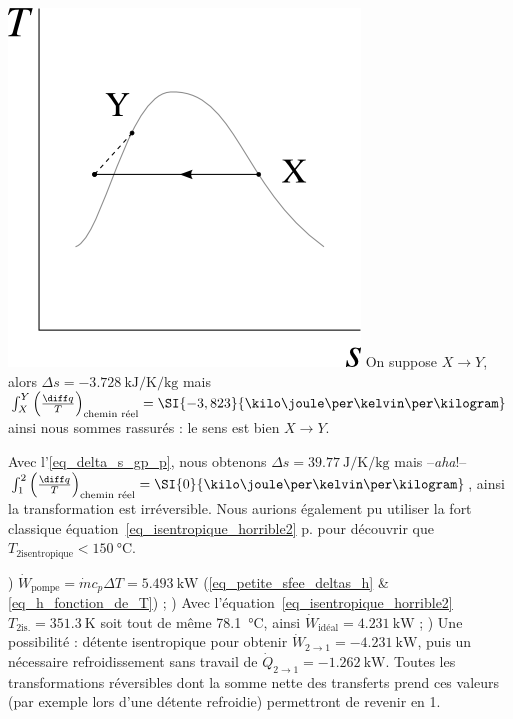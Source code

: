 \begin{description}
{						\includegraphics[width=\solutiondiagramwidth]{images/exo_sol_ts_bonsens2.png}
						\tab On suppose $X\to Y$, alors $\Delta s = \SI{-3,728}{\kilo\joule\per\kelvin\per\kilogram}$ mais $\int_X^Y \left(\frac{\diff q}{T}\right)_\text{chemin réel} = \SI{-3,823}{\kilo\joule\per\kelvin\per\kilogram}$ ainsi nous sommes rassurés : le sens est bien $X\to Y$.
		\item [\ref{exo_detente_air_irreversible}]
						\tab Avec l’\cref{eq_delta_s_gp_p}, nous obtenons $\Delta s = \SI{+39,77}{\joule\per\kelvin\per\kilogram}$ mais --\textit{aha}!-- $\int_1^2 \left(\frac{\diff q}{T}\right)_\text{chemin réel} = \SI{0}{\kilo\joule\per\kelvin\per\kilogram}$, ainsi la transformation est irréversible. Nous aurions également pu utiliser la fort classique équation~\ref{eq_isentropique_horrible2} p.\pageref{eq_isentropique_horrible2} pour découvrir que $T_{2 \text{isentropique}} < \SI{150}{\degreeCelsius}$.
		\item [\ref{exo_pompe_air}] 	
						) $\dot{W}_\text{pompe} = \dot m c_p \Delta T = \SI{+5,493}{\kilo\watt}$ (\ref{eq_petite_sfee_deltas_h} \& \ref{eq_h_fonction_de_T}) ;
						) Avec l’équation~\ref{eq_isentropique_horrible2} $T_{2 \text{is.}} = \SI{351,3}{\kelvin}$ soit tout de même \SI{78,1}{\degreeCelsius}, ainsi $\dot{W}_\text{idéal} = \SI{+4,231}{\kilo\watt}$ ;
						) Une possibilité : détente isentropique pour obtenir $\dot{W}_{2\to 1} = \SI{-4,231}{\kilo\watt}$, puis un nécessaire refroidissement sans travail de $\dot{Q}_{2\to 1} = \SI{-1,262}{\kilo\watt}$. Toutes les transformations réversibles dont la somme nette des transferts prend ces valeurs (par exemple lors d’une détente refroidie) permettront de revenir en 1.
}
\end{description}
